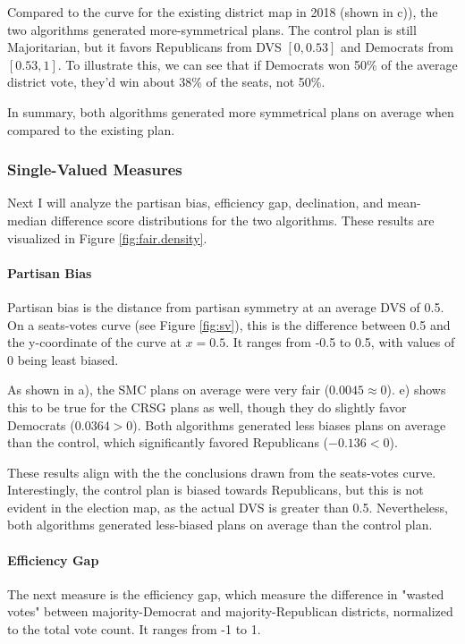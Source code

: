 Compared to the curve for the existing district map in 2018 (shown in c)), the two algorithms generated more-symmetrical plans. The control plan is still Majoritarian, but it favors Republicans from DVS $[0, 0.53]$ and Democrats from $[0.53, 1]$. To illustrate this, we can see that if Democrats won 50\% of the average district vote, they'd win about 38\% of the seats, not 50\%. 

In summary, both algorithms generated more symmetrical plans on average when compared to the existing plan. 

\subsubsection{Single-Valued Measures}

Next I will analyze the partisan bias, efficiency gap, declination, and mean-median difference score distributions for the two algorithms. These results are visualized in Figure \ref{fig:fair.density}.

\paragraph{Partisan Bias}

Partisan bias is the distance from partisan symmetry at an average DVS of 0.5. On a seats-votes curve (see Figure \ref{fig:sv}), this is the difference between 0.5 and the y-coordinate of the curve at $x=0.5$. It ranges from -0.5 to 0.5, with values of 0 being least biased. \parencite{katz2020}

As shown in a), the SMC plans on average were very fair ($0.0045 \approx 0$). e) shows this to be true for the CRSG plans as well, though they do slightly favor Democrats ($0.0364 > 0$). Both algorithms generated less biases plans on average than the control, which significantly favored Republicans ($-0.136 < 0$). 

These results align with the the conclusions drawn from the seats-votes curve. Interestingly, the control plan is biased towards Republicans, but this is not evident in the election map, as the actual DVS is greater than 0.5. Nevertheless, both algorithms generated less-biased plans on average than the control plan. 

\paragraph{Efficiency Gap}

The next measure is the efficiency gap, which measure the difference in "wasted votes" between majority-Democrat and majority-Republican districts, normalized to the total vote count. It ranges from -1 to 1. \parencite{stephanopoulos2014}

